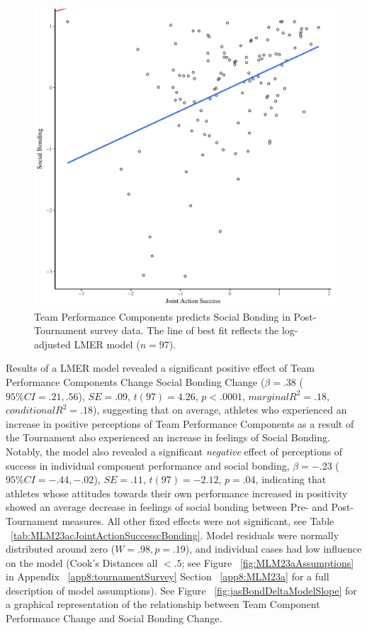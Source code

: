 \begin{CJK}{UTF8}{gbsn}
  \begin{figure}[htbp]
    \centering
  \includegraphics[scale=.5]{images/jasBondModelSlope.pdf}
    \caption{Team Performance Components predicts Social Bonding in Post-Tournament survey data. The line of best fit reflects the log-adjusted LMER model ($n = 97$).}
    \label{fig:jasBondModelSlope}
  \end{figure}




Results of a LMER model revealed a significant positive effect of  Team Performance Components Change Social Bonding Change ($\beta = .38$ ($95\% CI =  .21, .56$), $SE = .09$, $t(97) = 4.26$, $p < .0001$, $marginal R^2 = .18$, $conditional R^2 = .18$), suggesting that on average, athletes who experienced an increase in positive perceptions of Team Performance Components as a result of the Tournament also experienced an increase in feelings of Social Bonding.  Notably, the model also revealed a significant \textit{negative} effect of perceptions of success in individual component performance and social bonding, $\beta = -.23$ ($95\% CI =  -.44, -.02$), $SE = .11$, $t(97) = -2.12$, $p = .04$, indicating that athletes whose attitudes towards their own performance increased in positivity showed an average decrease in feelings of social bonding between Pre- and Post-Tournament measures.
All other fixed effects were not significant, see Table ~\ref{tab:MLM23acJointActionSuccesscBonding}. Model residuals were normally distributed around zero ($W = .98, p = .19$), and individual cases had low influence on the model (Cook's Distances all $< .5$; see Figure ~\ref{fig:MLM23aAssumptions} in Appendix ~\ref{app8:tournamentSurvey} Section ~\ref{app8:MLM23a} for a full description of model assumptions).  See Figure ~\ref{fig:jasBondDeltaModelSlope} for a graphical representation of the relationship between Team Component Performance Change and Social Bonding Change.


\end{CJK}
